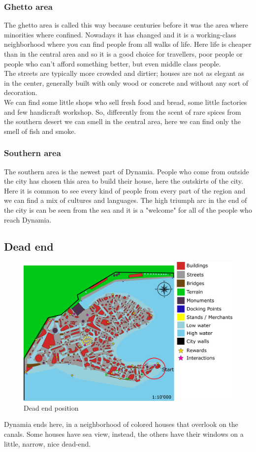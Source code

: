 \subsubsection{Ghetto area}
The ghetto area is called this way because centuries before it was the area where  minorities where confined. Nowadays it has changed and it is a working-class neighborhood where you can find people from all walks of life. Here life is cheaper than in the central area and so it is a good choice for travellers, poor people or people who can't afford something better, but even middle class people.\\
The streets are typically more crowded and dirtier; houses are not as elegant as in the center, generally built with only wood or concrete and without any sort of decoration. \\
We can find some little shops who sell fresh food and bread, some little factories and few handicraft workshop. So, differently from the scent of rare spices from the southern desert we can smell in the central area, here we can find only the smell of fish and smoke.
\subsubsection{Southern area}
The southern area is the newest part of Dynamia. People who come from outside the city has chosen this area to build their house, here the outskirts of the city. Here it is common to see every kind of people from every part of the region and we can find a mix of cultures and languages. The high triumph arc in the end of the city is can be seen from the sea and it is a "welcome" for all of the people who reach Dynamia. 
\subsection{Dead end}
\begin{figure}[H]
  \centering
  \includegraphics[width=12cm]{Images/Maps/dynamia_deadEnd}
  \caption{Dead end position}
\end{figure}
Dynamia ends here, in a neighborhood of colored houses that overlook on the canals. Some houses have sea view, instead, the others have their windows on a little, narrow, nice dead-end.

